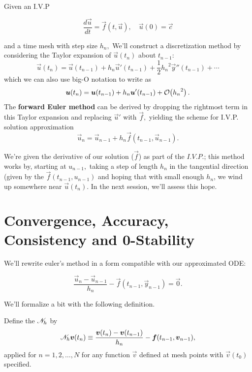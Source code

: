 \documentclass{article}
\begin{document}
\begin{definition}
	Given an \@{I.V.P}
	
	\[ \frac{d\vec{u}}{dt} = \vec{f}(t, \vec{u}), \quad \vec{u}(0) = \vec{c} \]

	and a \@{time mesh} with step size $h_n,$ We'll construct a \@{discretization} method by considering the \@{Taylor expansion} of $\vec{u}(t_n)$ about $t_{n-1}$:
\[ \vec{u}(t_n) =  \vec{u}(t_{n-1}) + h_n \vec{u}'(t_{n-1}) + \frac{1}{2}{h_n}^2 \vec{y}''(t_{n-1}) + \cdots \]
which we can also use \@{big-O notation} to write as
\[ \boldsymbol{u}(t_n) =  \boldsymbol{u}(t_{n-1}) + h_n \boldsymbol{u}'(t_{n-1}) + \mathcal{O}\!\left({h_n}^2\right). \]
	The \textbf{forward Euler method} can be derived by dropping the rightmost term in this Taylor expansion and replacing $\vec{u}'$ with $\vec{f},$ yielding the scheme for \@{I.V.P. solution approximation}
	\[ \vec{u}_n = \vec{u}_{n-1} + h_n \vec{f}(t_{n-1}, \vec{u}_{n-1}). \]
\end{definition}
\begin{intuition}
	We're given the derivative of our solution ($\vec{f}$) as part of the $I.V.P.$; this method works by, starting at $u_{n-1},$ taking a step of length $h_n$ in the tangential direction (given by the $\vec{f}(t_{n-1}, u_{n-1})$ and hoping that with small enough $h_n$, we wind up somewhere near $\vec{u}(t_n)$. In the next session, we'll assess this hope.
\end{intuition}

\section{Convergence, Accuracy, Consistency and 0-Stability}

We'll rewrite \@{euler's method} in a form compatible with our approximated ODE:

\[ \frac{\vec{u}_n - \vec{u}_{n-1}}{h_n} - \vec{f}(t_{n-1}, \vec{y}_{n-1}) = \vec{0}. \]

We'll formalize a bit with the following definition.

\begin{definition}
	Define the  $\mathscr{N}_h$ by
	\[ \mathscr{N}_h \boldsymbol{v}(t_n) \equiv \frac{\boldsymbol{v}(t_n) - \boldsymbol{v}(t_{n-1})}{h_n} - \boldsymbol{f}(t_{n-1}, \boldsymbol{v}_{n-1}), \]
	applied for $n = 1,2,\dots,N$ for any \@{function} $\vec{v}$ defined at \@{mesh points} with $\vec{v}(t_0)$ specified.
\end{definition}
\end{document}
